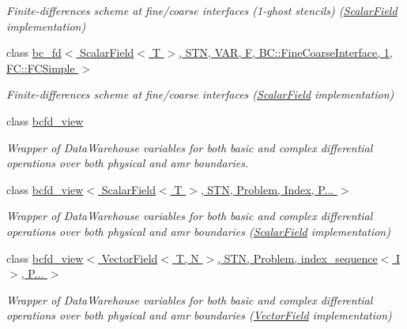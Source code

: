 \begin{DoxyCompactItemize}
\begin{DoxyCompactList}\small\item\em Finite-\/differences scheme at fine/coarse interfaces (1-\/ghost stencils) (\hyperlink{structUintah_1_1PhaseField_1_1ScalarField}{Scalar\+Field} implementation) \end{DoxyCompactList}\item 
class \hyperlink{classUintah_1_1PhaseField_1_1detail_1_1bc__fd_3_01ScalarField_3_01T_01_4_00_01STN_00_01VAR_00_01ce55d0bf8381798bc129da931b626e80}{bc\+\_\+fd$<$ Scalar\+Field$<$ T $>$, S\+T\+N, V\+A\+R, F, B\+C\+::\+Fine\+Coarse\+Interface, 1, F\+C\+::\+F\+C\+Simple $>$}
\begin{DoxyCompactList}\small\item\em Finite-\/differences scheme at fine/coarse interfaces (\hyperlink{structUintah_1_1PhaseField_1_1ScalarField}{Scalar\+Field} implementation) \end{DoxyCompactList}\item 
class \hyperlink{classUintah_1_1PhaseField_1_1detail_1_1bcfd__view}{bcfd\+\_\+view}
\begin{DoxyCompactList}\small\item\em Wrapper of Data\+Warehouse variables for both basic and complex differential operations over both physical and amr boundaries. \end{DoxyCompactList}\item 
class \hyperlink{classUintah_1_1PhaseField_1_1detail_1_1bcfd__view_3_01ScalarField_3_01T_01_4_00_01STN_00_01Problem_00_01Index_00_01P_8_8_8_01_4}{bcfd\+\_\+view$<$ Scalar\+Field$<$ T $>$, S\+T\+N, Problem, Index, P... $>$}
\begin{DoxyCompactList}\small\item\em Wrapper of Data\+Warehouse variables for both basic and complex differential operations over both physical and amr boundaries (\hyperlink{structUintah_1_1PhaseField_1_1ScalarField}{Scalar\+Field} implementation) \end{DoxyCompactList}\item 
class \hyperlink{classUintah_1_1PhaseField_1_1detail_1_1bcfd__view_3_01VectorField_3_01T_00_01N_01_4_00_01STN_00_1a8b5a6da126f9f6f13d940aa745f239}{bcfd\+\_\+view$<$ Vector\+Field$<$ T, N $>$, S\+T\+N, Problem, index\+\_\+sequence$<$ I $>$, P... $>$}
\begin{DoxyCompactList}\small\item\em Wrapper of Data\+Warehouse variables for both basic and complex differential operations over both physical and amr boundaries (\hyperlink{structUintah_1_1PhaseField_1_1VectorField}{Vector\+Field} implementation) \end{DoxyCompactList}\item 

\end{DoxyCompactItemize}
